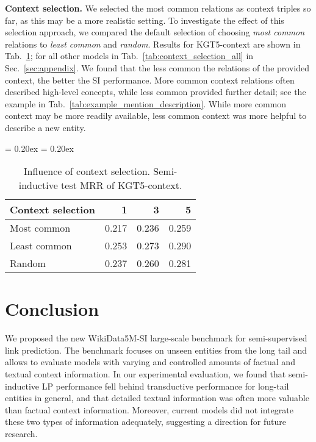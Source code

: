 \documentclass[11pt]{article}
\renewcommand\:{\colon} \newcommand{\sset}[1]{\left\{\,#1\,\right\}} \newcommand{\ssets}[1]{\left\{#1\right\}} \newcommand{\ssetn}[1]{\{\,#1\,\}}
\begin{document}
\textbf{Context selection.} We selected the most common relations as context
triples so far, as this may be a more realistic setting. To investigate the
effect of this selection approach, we compared the default selection of choosing
\emph{most common} relations to \emph{least common} and \emph{random}. Results
for KGT5-context are shown in Tab.~\ref{tab:context_selection}; for all other
models in Tab.~\ref{tab:context_selection_all} in Sec.~\ref{sec:appendix}. We
found that the less common the relations of the provided context, the better the
SI performance. More common context relations often described high-level
concepts, while less common provided further detail; see the example in
Tab.~\ref{tab:example_mention_description}. While more common context may
be more readily available, less common context was more helpful to describe a new
entity.





\begin{table}
  \centering
  \resizebox{0.9\columnwidth}{!}
  {
  \aboverulesep = 0.20ex
  \belowrulesep = 0.20ex
  \begin{tabular}{lrrr}
    \toprule
    \textbf{Context selection} & \textbf{1} & \textbf{3} & \textbf{5} \\
    \midrule
    Most common & 0.217 & 0.236 & 0.259 \\
    Least common & 0.253 & 0.273 & 0.290 \\
    Random & 0.237 & 0.260 & 0.281 \\
    \bottomrule
  \end{tabular}
  }
  \caption{Influence of context selection. Semi-inductive test MRR of KGT5-context.}
  \label{tab:context_selection}
\end{table}

\section{Conclusion}
\label{sec:conclusion}

We proposed the new WikiData5M-SI large-scale benchmark for semi-supervised link
prediction. The benchmark focuses on unseen entities from the long tail and
allows to evaluate models with varying and controlled amounts of factual and
textual context information.
In our experimental evaluation, we found that semi-inductive LP performance fell
behind transductive performance for long-tail entities in general, and that
detailed textual information was often more valuable than factual context
information. Moreover, current models did not integrate these two types of
information adequately, suggesting a direction for future research.
\end{document}
